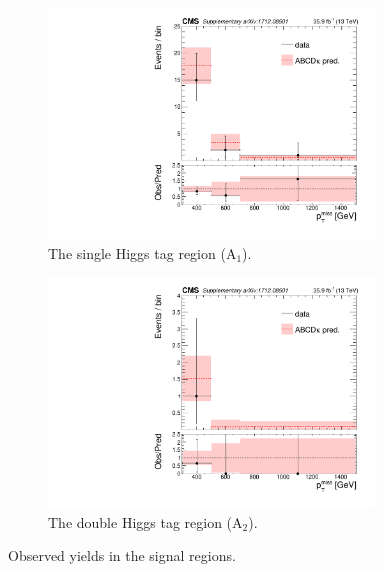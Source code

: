 \begin{figure}[hbp!]
\centering
\begin{subfigure}[b]{0.425\textwidth}
\centering
\includegraphics[trim={5px 5px 5px 5px},clip,width=0.95\textwidth]{figs/CMS-SUS-17-006_Figure-aux_004.pdf}
\caption{The single Higgs tag region (A$_{1}$).}
\end{subfigure}
\begin{subfigure}[b]{0.425\textwidth}
\centering
\includegraphics[trim={5px 5px 5px 5px},clip,width=0.95\textwidth]{figs/CMS-SUS-17-006_Figure-aux_005.pdf} 
\caption{The double Higgs tag region (A$_{2}$).}
\end{subfigure}
\caption{Observed yields in the signal regions.}
\label{fig:datayields}
\end{figure}

